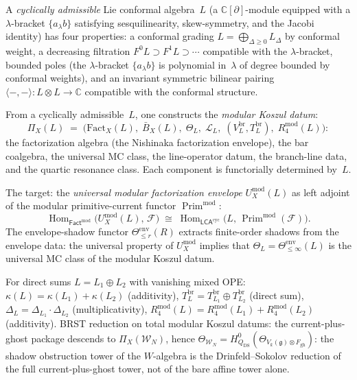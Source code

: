 \documentclass[11pt]{report}
\theoremstyle{definition}
\theoremstyle{remark}
\providecommand{\cF}{\mathcal{F}}
\providecommand{\cL}{\mathcal{L}}
\providecommand{\fg}{\mathfrak{g}}
\numberwithin{equation}{section}
\begin{document}
A \emph{cyclically admissible} Lie conformal algebra~$L$
(a $\mathbb C[\partial]$-module equipped with a $\lambda$-bracket
$\{a_\lambda b\}$ satisfying sesquilinearity, skew-symmetry,
and the Jacobi identity) has four
properties: a conformal grading $L=\bigoplus_{\Delta\ge 0}L_\Delta$
by conformal weight, a decreasing filtration
$F^0 L\supset F^1 L\supset\cdots$ compatible with the
$\lambda$-bracket, bounded poles (the $\lambda$-bracket
$\{a_\lambda b\}$ is polynomial in~$\lambda$ of degree bounded by
conformal weights), and an invariant symmetric bilinear pairing
$\langle-,-\rangle\colon L\otimes L\to\mathbb C$ compatible with
the conformal structure.

From a cyclically admissible~$L$, one constructs the
\emph{modular Koszul datum}:
\[
\Pi_X(L)
\;=\;
\bigl(\mathrm{Fact}_X(L),\;\bar B_X(L),\;\Theta_L,\;
\cL_L,\;(V^{\mathrm{br}}_L,T^{\mathrm{br}}_L),\;
R_4^{\mathrm{mod}}(L)\bigr):
\]
the factorization algebra (the Nishinaka factorization envelope),
the bar coalgebra, the universal MC class, the line-operator datum,
the branch-line data, and the quartic resonance class. Each
component is functorially determined by~$L$.

The target: the \emph{universal modular factorization envelope}
$U^{\mathrm{mod}}_X(L)$ as left adjoint of the modular
primitive-current functor $\operatorname{Prim}^{\mathrm{mod}}$:
\[
\operatorname{Hom}_{\mathsf{Fact}^{\mathrm{mod}}}
\bigl(U^{\mathrm{mod}}_X(L),\,\cF\bigr)
\;\cong\;
\operatorname{Hom}_{\mathsf{LCA}^{\mathrm{cyc}}}
\bigl(L,\,\operatorname{Prim}^{\mathrm{mod}}(\cF)\bigr).
\]
The envelope-shadow functor $\Theta^{\mathrm{env}}_{\le r}(R)$
extracts finite-order shadows from the envelope data: the
universal property of $U^{\mathrm{mod}}_X$ implies that
$\Theta_L=\Theta^{\mathrm{env}}_{\le\infty}(L)$ is the universal
MC class of the modular Koszul datum.

For direct sums $L=L_1\oplus L_2$ with vanishing mixed OPE:
$\kappa(L)=\kappa(L_1)+\kappa(L_2)$ (additivity),
$T^{\mathrm{br}}_L=T^{\mathrm{br}}_{L_1}\oplus T^{\mathrm{br}}_{L_2}$
(direct sum), $\Delta_L=\Delta_{L_1}\cdot\Delta_{L_2}$
(multiplicativity), $R_4^{\mathrm{mod}}(L)
=R_4^{\mathrm{mod}}(L_1)+R_4^{\mathrm{mod}}(L_2)$ (additivity).
BRST reduction on total modular Koszul datums:
the current-plus-ghost package descends to
$\Pi_X(\mathcal W_N)$, hence
$\Theta_{\mathcal W_N}
=H^0_{Q_{\mathrm{DS}}}(\Theta_{V_k(\fg)\otimes F_{\mathrm{gh}}})$:
the shadow obstruction tower of the $W$-algebra is the Drinfeld--Sokolov
reduction of the full current-plus-ghost tower, not of the bare
affine tower alone.
\end{document}
